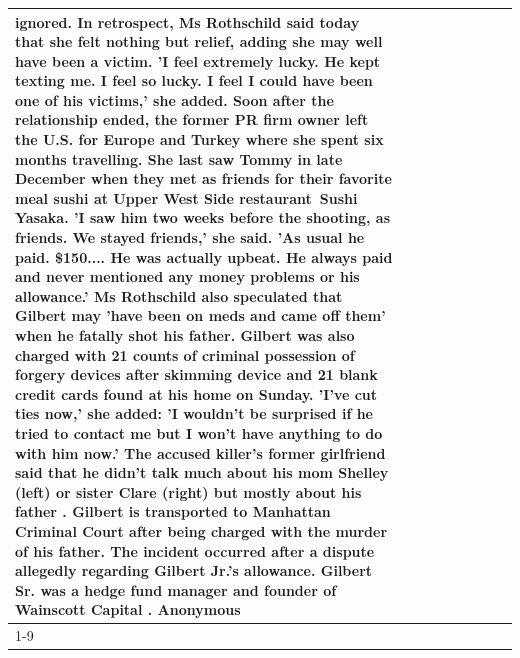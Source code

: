 \begin{table}[H]
\begin{tabular}{lllrlllll}
ignored. In retrospect, Ms Rothschild said today that she felt nothing but relief, adding she may well have been a victim. 'I feel extremely lucky. He kept texting me. I feel so lucky. I feel I could have been one of his victims,' she added. Soon after the relationship ended, the former PR firm owner left the U.S. for Europe and Turkey where she spent six months  travelling. She last saw Tommy in late December when they met as friends for their favorite meal sushi at Upper West Side restaurant Sushi Yasaka. 'I saw him two weeks before the shooting, as friends. We stayed friends,' she said. 'As usual he paid. \$150.... He was actually upbeat. He always paid and never mentioned any money problems or his allowance.' Ms Rothschild also speculated that Gilbert may 'have been on meds and came off them' when he fatally shot his father. Gilbert was also charged with 21 counts of criminal possession of forgery devices after skimming device and 21 blank credit cards found at his home on Sunday. 'I've cut ties now,' she added: 'I wouldn’t be surprised if he tried to contact me but I won’t have anything to do with him now.' The accused killer's former girlfriend said that he didn't talk much about his mom Shelley (left) or sister Clare (right) but mostly about his father . Gilbert is transported to Manhattan Criminal Court  after being charged with the murder of his father. The incident occurred after a dispute allegedly regarding Gilbert Jr.'s allowance. Gilbert Sr. was a hedge fund manager and founder of Wainscott Capital . Anonymous \\
\cline{1-9}

\end{tabular}
\end{table}
